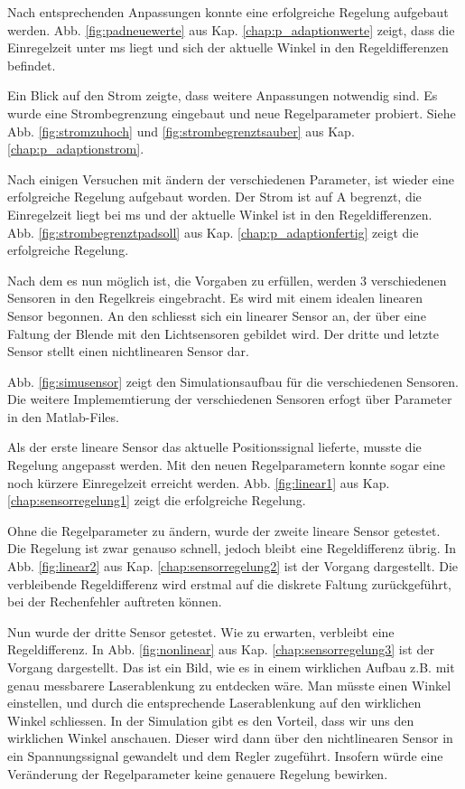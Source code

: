 Nach entsprechenden Anpassungen konnte eine erfolgreiche Regelung aufgebaut werden.
Abb. \ref{fig:padneuewerte} aus Kap. \ref{chap:p_adaptionwerte} zeigt, dass die Einregelzeit unter \unit[1]{ms} liegt und sich der aktuelle Winkel in den Regeldifferenzen 
befindet.

Ein Blick auf den Strom zeigte, dass weitere Anpassungen notwendig sind.
Es wurde eine Strombegrenzung eingebaut und neue Regelparameter probiert.
Siehe Abb. \ref{fig:stromzuhoch} und \ref{fig:strombegrenztsauber} aus Kap. \ref{chap:p_adaptionstrom}.

Nach einigen Versuchen mit ändern der verschiedenen Parameter, ist wieder eine erfolgreiche Regelung aufgebaut worden.
Der Strom ist auf \unit[10]{A} begrenzt, die Einregelzeit liegt bei \unit[1]{ms} und der aktuelle Winkel ist in den Regeldifferenzen.
Abb. \ref{fig:strombegrenztpadsoll} aus Kap. \ref{chap:p_adaptionfertig} zeigt die erfolgreiche Regelung.

Nach dem es nun möglich ist, die Vorgaben zu erfüllen, werden 3 verschiedenen Sensoren in den Regelkreis eingebracht.
Es wird mit einem idealen linearen Sensor begonnen.
An den schliesst sich ein linearer Sensor an, der über eine Faltung der Blende mit den Lichtsensoren gebildet wird.
Der dritte und letzte Sensor stellt einen nichtlinearen Sensor dar.

Abb. \ref{fig:simusensor} zeigt den Simulationsaufbau für die verschiedenen Sensoren.
Die weitere Implememtierung der verschiedenen Sensoren erfogt über Parameter in den Matlab-Files.

Als der erste lineare Sensor das aktuelle Positionssignal lieferte, musste die Regelung angepasst werden.
Mit den neuen Regelparametern konnte sogar eine noch kürzere Einregelzeit erreicht werden.
Abb. \ref{fig:linear1} aus Kap. \ref{chap:sensorregelung1} zeigt die erfolgreiche Regelung.

Ohne die Regelparameter zu ändern, wurde der zweite lineare Sensor getestet.
Die Regelung ist zwar genauso schnell, jedoch bleibt eine Regeldifferenz übrig.
In Abb. \ref{fig:linear2} aus Kap. \ref{chap:sensorregelung2} ist der Vorgang dargestellt.
Die verbleibende Regeldifferenz wird erstmal auf die diskrete Faltung zurückgeführt, bei der Rechenfehler auftreten können.

Nun wurde der dritte Sensor getestet.
Wie zu erwarten, verbleibt eine Regeldifferenz.
In Abb. \ref{fig:nonlinear} aus Kap. \ref{chap:sensorregelung3} ist der Vorgang dargestellt.
Das ist ein Bild, wie es in einem wirklichen Aufbau z.B. mit genau messbarere Laserablenkung zu entdecken wäre.
Man müsste einen Winkel einstellen, und durch die entsprechende Laserablenkung auf den wirklichen Winkel schliessen.
In der Simulation gibt es den Vorteil, dass wir uns den wirklichen Winkel anschauen.
Dieser wird dann über den nichtlinearen Sensor in ein Spannungssignal gewandelt und dem Regler zugeführt.
Insofern würde eine Veränderung der Regelparameter keine genauere Regelung bewirken.

